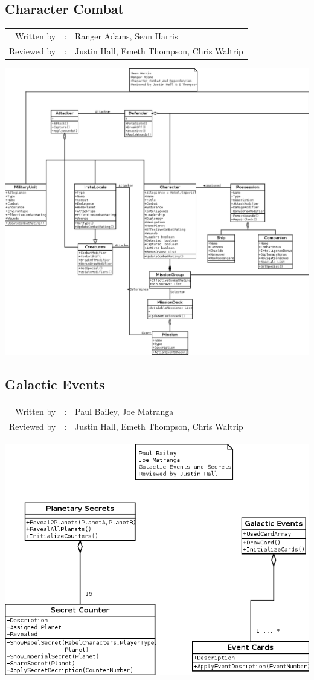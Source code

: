 \documentclass[12pt,letterpaper]{article}
\begin{document}
	\subsection{Character Combat}
	\begin{tabularx}{\linewidth}{rcX}
				Written by & : & Ranger Adams, Sean Harris \\
				Reviewed by & : & Justin Hall, Emeth Thompson, Chris Waltrip  
	\end{tabularx}
		\includegraphics[width=\textwidth,height=\textheight,keepaspectratio]{./images/character_combat}
	\subsection{Galactic Events}
	\begin{tabularx}{\linewidth}{rcX}
				Written by & : & Paul Bailey, Joe Matranga \\
				Reviewed by & : & Justin Hall, Emeth Thompson, Chris Waltrip  
	\end{tabularx}
		\includegraphics[width=\textwidth,height=\textheight,keepaspectratio]{./images/galactic_events}	
	
\end{document}
